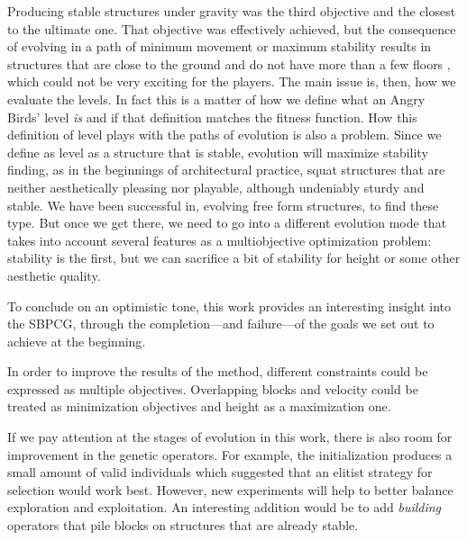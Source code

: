 \documentclass[runningheads,a4paper]{llncs}
\begin{document}
Producing stable structures under gravity was the third objective and
the closest to the ultimate one. That objective was effectively
achieved, but the consequence of evolving in a path of minimum
movement or maximum stability results in structures that are close to
the ground and do not have more than a few floors , which could not be very 
exciting for the players. 
The main issue is, then, how we evaluate the levels. In fact this is 
a matter of how we define what an Angry Birds' level \textit{is} and if that 
definition matches the fitness function.
How this definition of level plays
with the paths of evolution is also a problem. Since we define as
level as a structure that is stable, evolution will maximize stability
finding, as in the beginnings of architectural practice, squat
structures that are neither aesthetically pleasing nor playable,
although undeniably sturdy and stable. We have been successful in,
evolving free form structures, to find these type. But once we get
there, we need to go into a different evolution mode that takes into
account several features as a multiobjective optimization problem:
stability is the first, but we can sacrifice a bit of stability for
height or some other aesthetic quality.


To conclude on an optimistic tone, this work provides an interesting insight 
into the SBPCG, through the completion---and failure---of the goals we
set out to achieve at the beginning.

In order to improve the results of the method, different constraints could be 
expressed as multiple objectives. Overlapping blocks and velocity could 
be treated as minimization objectives and height as a maximization one. %

If we pay attention at the stages of evolution in this work, there is also 
room for improvement in the genetic operators. For example, the initialization 
produces a small amount of valid individuals which suggested that an elitist 
strategy for selection would work best. However, new experiments will help to 
better balance exploration and exploitation. An interesting addition
would be to add {\em building} operators that pile blocks on
structures that are already stable. %
\end{document}
